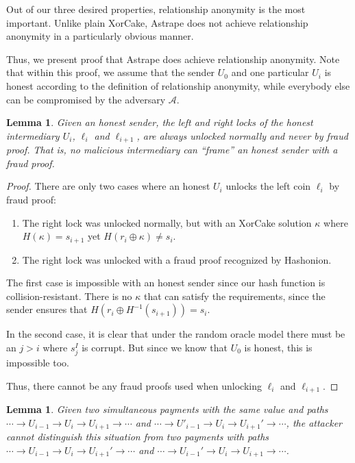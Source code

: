 \documentclass[USenglish,oneside,twocolumn]{article}
\newtheorem{lemma}[theorem]{Lemma}
\begin{document}
Out of our three desired properties, relationship anonymity is the most important. Unlike plain XorCake, Astrape does not achieve relationship anonymity in a particularly obvious manner.

Thus, we present proof that Astrape does achieve relationship anonymity. Note that within this proof, we assume that the sender $U_0$ and one particular $U_i$ is honest according to the definition of relationship anonymity, while everybody else can be compromised by the adversary $\mathcal{A}$.

\begin{lemma}\label{lem:nocol}
    Given an honest sender, the left and right locks of the honest intermediary $U_i$, $\ell_i$ and $\ell_{i+1}$, are always unlocked normally and never by fraud proof. That is, no malicious intermediary can ``frame'' an honest sender with a fraud proof.
\end{lemma}

\begin{proof}
    There are only two cases where an honest $U_i$ unlocks the left coin $\ell_i$ by fraud proof:
    \begin{enumerate}
        \item The right lock was unlocked normally, but with an XorCake solution $\kappa$ where $H(\kappa) = s_{i+1}$ yet $H(r_i \oplus \kappa) \neq s_i$.
        \item The right lock was unlocked with a fraud proof recognized by Hashonion.
    \end{enumerate}

    The first case is impossible with an honest sender since our hash function is collision-resistant. There is no $\kappa$ that can satisfy the requirements, since the sender ensures that $H(r_i \oplus H^{-1}(s_{i+1})) = s_i$.

    In the second case, it is clear that under the random oracle model there must be an $j > i$ where $s^I_j$ is corrupt. But since we know that $U_0$ is honest, this is impossible too.

    Thus, there cannot be any fraud proofs used when unlocking $\ell_i$ and $\ell_{i+1}$.
\end{proof}

\begin{lemma}\label{lem:confuse}
    Given two simultaneous payments with the same value and paths $\cdots \rightarrow U_{i-1} \rightarrow U_i \rightarrow U_{i+1} \rightarrow \cdots $ and $\cdots \rightarrow U'_{i-1} \rightarrow U_i \rightarrow U_{i+1}' \rightarrow \cdots$, the attacker cannot distinguish this situation from two payments with paths $\cdots \rightarrow U_{i-1} \rightarrow U_i \rightarrow U_{i+1}' \rightarrow \cdots$ and $\cdots \rightarrow U_{i-1}' \rightarrow U_i \rightarrow U_{i+1} \rightarrow \cdots $.
\end{lemma}
\end{document}
